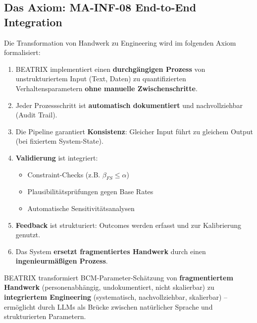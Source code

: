 \subsection{Das Axiom: MA-INF-08 End-to-End Integration}

Die Transformation von Handwerk zu Engineering wird im folgenden Axiom formalisiert:

\begin{axiom}
\begin{enumerate}
    \item BEATRIX implementiert einen \textbf{durchgängigen Prozess} von unstrukturiertem Input (Text, Daten) zu quantifizierten Verhaltensparametern \textbf{ohne manuelle Zwischenschritte}.

    \item Jeder Prozessschritt ist \textbf{automatisch dokumentiert} und nachvollziehbar (Audit Trail).

    \item Die Pipeline garantiert \textbf{Konsistenz}: Gleicher Input führt zu gleichem Output (bei fixiertem System-State).

    \item \textbf{Validierung} ist integriert:
    \begin{itemize}
        \item Constraint-Checks (z.B. $\beta_{FS} \leq \alpha$)
        \item Plausibilitätsprüfungen gegen Base Rates
        \item Automatische Sensitivitätsanalysen
    \end{itemize}

    \item \textbf{Feedback} ist strukturiert: Outcomes werden erfasst und zur Kalibrierung genutzt.

    \item Das System \textbf{ersetzt fragmentiertes Handwerk} durch einen \textbf{ingenieurmäßigen Prozess}.
\end{enumerate}
\end{axiom}

\begin{tcolorbox}[colback=green!5!white, colframe=green!75!black, title=Die Transformation in einem Satz]
BEATRIX transformiert BCM-Parameter-Schätzung von \textbf{fragmentiertem Handwerk} (personenabhängig, undokumentiert, nicht skalierbar) zu \textbf{integriertem Engineering} (systematisch, nachvollziehbar, skalierbar) -- ermöglicht durch LLMs als Brücke zwischen natürlicher Sprache und strukturierten Parametern.
\end{tcolorbox}

